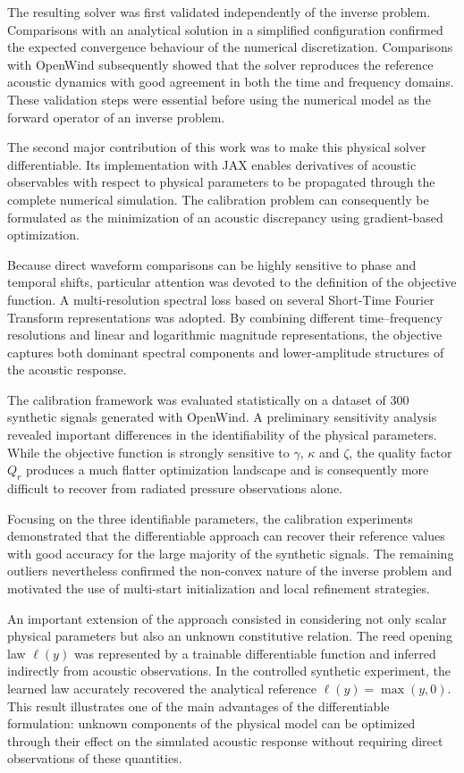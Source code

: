 \documentclass[11pt,a4paper]{report}
\theoremstyle{plain}
\theoremstyle{definition}
\begin{document}
The resulting solver was first validated independently of the inverse problem.
Comparisons with an analytical solution in a simplified configuration confirmed
the expected convergence behaviour of the numerical discretization.
Comparisons with OpenWind subsequently showed that the solver reproduces the
reference acoustic dynamics with good agreement in both the time and frequency
domains. These validation steps were essential before using the numerical model
as the forward operator of an inverse problem.

The second major contribution of this work was to make this physical solver
differentiable. Its implementation with JAX enables derivatives of acoustic
observables with respect to physical parameters to be propagated through the
complete numerical simulation. The calibration problem can consequently be
formulated as the minimization of an acoustic discrepancy using gradient-based
optimization.

Because direct waveform comparisons can be highly sensitive to phase and
temporal shifts, particular attention was devoted to the definition of the
objective function. A multi-resolution spectral loss based on several
Short-Time Fourier Transform representations was adopted. By combining
different time--frequency resolutions and linear and logarithmic magnitude
representations, the objective captures both dominant spectral components and
lower-amplitude structures of the acoustic response.

The calibration framework was evaluated statistically on a dataset of
300 synthetic signals generated with OpenWind. A preliminary sensitivity
analysis revealed important differences in the identifiability of the physical
parameters. While the objective function is strongly sensitive to
$\gamma$, $\kappa$ and $\zeta$, the quality factor $Q_r$ produces a much
flatter optimization landscape and is consequently more difficult to recover
from radiated pressure observations alone.

Focusing on the three identifiable parameters, the calibration experiments
demonstrated that the differentiable approach can recover their reference
values with good accuracy for the large majority of the synthetic signals.
The remaining outliers nevertheless confirmed the non-convex nature of the
inverse problem and motivated the use of multi-start initialization and local
refinement strategies.

An important extension of the approach consisted in considering not only
scalar physical parameters but also an unknown constitutive relation. The reed
opening law $\ell(y)$ was represented by a trainable differentiable function
and inferred indirectly from acoustic observations. In the controlled
synthetic experiment, the learned law accurately recovered the analytical
reference $\ell(y)=\max(y,0)$. This result illustrates one of the main
advantages of the differentiable formulation: unknown components of the
physical model can be optimized through their effect on the simulated acoustic
response without requiring direct observations of these quantities.
\end{document}
